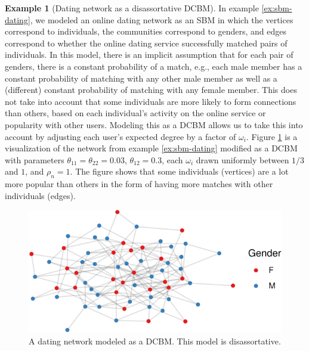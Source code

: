 \documentclass[
  12pt,
]{article}
\theoremstyle{definition}
\theoremstyle{definition}
\newtheorem{example}{Example}[section]
\theoremstyle{definition}
\theoremstyle{definition}
\theoremstyle{remark}
\begin{document}
\begin{example}[Dating network as a disassortative DCBM]
\label{ex:dcbm-dating}
In example \ref{ex:sbm-dating}, we modeled an online dating network as an SBM in which the vertices correspond to individuals, the communities correspond to genders, and edges correspond to whether the online dating service successfully matched pairs of individuals. 
In this model, there is an implicit assumption that for each pair of genders, there is a constant probability of a match, e.g., each male member has a constant probability of matching with any other male member as well as a (different) constant probability of matching with any female member. 
This does not take into account that some individuals are more likely to form connections than others, based on each individual's activity on the online service or popularity with other users. 
Modeling this as a DCBM allows us to take this into account by adjusting each user's expected degree by a factor of $\omega_i$. 
Figure \ref{fig:dating-dcbm} is a visualization of the network from example \ref{ex:sbm-dating} modified as a DCBM with parameters $\theta_{11} = \theta_{22} = 0.03$, $\theta_{12} = 0.3$, each $\omega_i$ drawn uniformly between $1/3$ and $1$, and $\rho_n = 1$. 
The figure shows that some individuals (vertices) are a lot more popular than others in the form of having more matches with other individuals (edges). 

\begin{figure}[H]

{\centering \includegraphics{draft_files/figure-latex/dating-dcbm-1} 

}

\caption{A dating network modeled as a DCBM. This model is disassortative.}\label{fig:dating-dcbm}
\end{figure}
\end{example}
\end{document}
